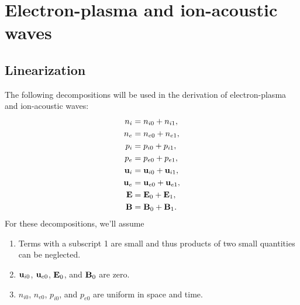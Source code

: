 \documentclass[a4paper,11pt]{report}
\begin{document}
\section{Electron-plasma and ion-acoustic waves}

\subsection{Linearization}
\label{sec:p_waves_linearization}
The following decompositions will be used in the derivation of electron-plasma and ion-acoustic waves:
\begin{align}
    n_i &= n_{i0} + n_{i1}, \nonumber \\
    n_e &= n_{e0} + n_{e1}, \nonumber \\
    p_i &= p_{i0} + p_{i1}, \nonumber \\
    p_e &= p_{e0} + p_{e1}, \nonumber \\
    \mathbf{u}_i &= \mathbf{u}_{i0} + \mathbf{u}_{i1}, \nonumber \\
    \mathbf{u}_e &= \mathbf{u}_{e0} + \mathbf{u}_{e1}, \nonumber \\
    \mathbf{E} &= \mathbf{E}_0 + \mathbf{E}_1, \nonumber \\
    \mathbf{B} &= \mathbf{B}_0 + \mathbf{B}_1.
\end{align}
For these decompositions, we'll assume
\begin{enumerate}
    \item Terms with a subscript 1 are small and thus products of two small quantities can be neglected. \label{it:p_waves_assumption_1}
    \item $\mathbf{u}_{i0}$, $\mathbf{u}_{e0}$, $\mathbf{E}_0$, and $\mathbf{B}_0$ are zero. \label{it:p_waves_assumption_2}
    \item $n_{i0}$, $n_{e0}$, $p_{i0}$, and $p_{e0}$ are uniform in space and time. \label{it:p_waves_assumption_3}
\end{enumerate}
\end{document}
